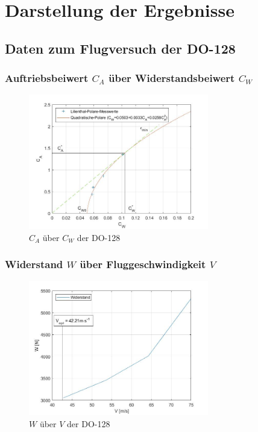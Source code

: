 \chapter{Darstellung der Ergebnisse}
\label{c:Ergebnisse}

\section{Daten zum Flugversuch der DO-128}

\subsection{Auftriebsbeiwert $C_A$ über Widerstandsbeiwert $C_{W}$}

\begin{figure}[H]
	\centering	\includegraphics[width=0.7\textwidth]{./Bilder/CA_CW_DO128_NEU.jpg}
	\caption{$C_{A}$ über $C_{W}$ der DO-128}
	\label{fig:CA_CW_DO128}
\end{figure}

\subsection{Widerstand $W$ über Fluggeschwindigkeit $V$}

\begin{figure}[H]
	\centering	\includegraphics[width=0.7\textwidth]{./Bilder/W_V_DO128_NEU.jpg}
	\caption{$W$ über $V$ der DO-128}
	\label{fig:W_V_DO128}
\end{figure}

